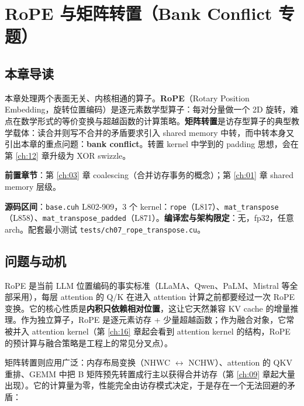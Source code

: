 \chapter{RoPE 与矩阵转置（Bank Conflict 专题）}\label{ch:07}

\section{本章导读}

本章处理两个表面无关、内核相通的算子。\textbf{RoPE}（Rotary Position Embedding，旋转位置编码）是逐元素数学型算子：每对分量做一个 2D 旋转，难点在数学形式的等价变换与超越函数的计算策略。\textbf{矩阵转置}是访存型算子的典型教学载体：读合并则写不合并的矛盾要求引入 shared memory 中转，而中转本身又引出本章的重点问题：\textbf{bank conflict}。转置 kernel 中学到的 padding 思想，会在第 \ref{ch:12} 章升级为 XOR swizzle。

\textbf{前置章节}：第 \ref{ch:03} 章 coalescing（合并访存事务的概念）；第 \ref{ch:01} 章 shared memory 层级。

\textbf{源码区间}：\texttt{base.cuh} L802-909，3 个 kernel：\texttt{rope}（L817）、\texttt{mat\_\allowbreak{}transpose}（L858）、\texttt{mat\_\allowbreak{}transpose\_\allowbreak{}padded}（L871）。\textbf{编译宏与架构限定}：无，fp32，任意 arch。配套最小测试 \texttt{tests/\allowbreak{}ch07\_\allowbreak{}rope\_\allowbreak{}transpose.\allowbreak{}cu}。

\section{问题与动机}

RoPE 是当前 LLM 位置编码的事实标准（LLaMA、Qwen、PaLM、Mistral 等全部采用），每层 attention 的 Q/K 在进入 attention 计算之前都要经过一次 RoPE 变换。它的核心性质是\textbf{内积只依赖相对位置}，这让它天然兼容 KV cache 的增量推理。作为独立算子，RoPE 是逐元素访存 + 少量超越函数；作为融合对象，它常被并入 attention kernel（第 \ref{ch:16} 章起会看到 attention kernel 的结构，RoPE 的预计算与融合策略是工程上的常见分叉点）。

矩阵转置则应用广泛：内存布局变换（NHWC $\leftrightarrow$ NCHW）、attention 的 QKV 重排、GEMM 中把 B 矩阵预先转置成行主以获得合并访存（第 \ref{ch:09} 章起大量出现）。它的计算量为零，性能完全由访存模式决定，于是存在一个无法回避的矛盾：

